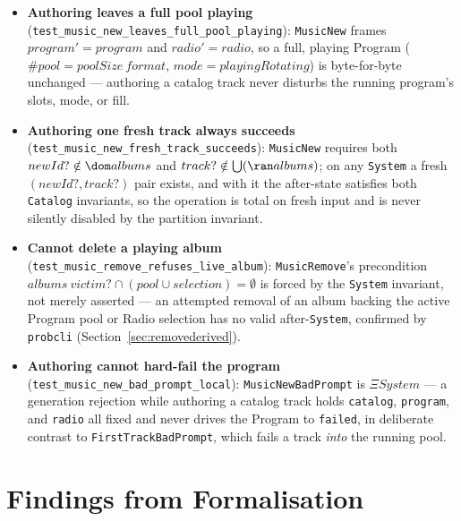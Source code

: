 \documentclass[a4paper,10pt,fleqn]{article}
\begin{document}
\begin{itemize}
    generate-internal outcome (\texttt{StaleFillIgnored}) and the auto
    vibe-switch (\texttt{RadioVibeIgnored}) stay \emph{enabled} against a Radio
    as total $\Xi Radio$ no-ops --- they are ignored, not disabled, and never
    errors. What is disabled is only the \emph{successful} fill branch: its
    $filling = ztrue$ guard has no inhabitant in a \texttt{Radio}, so that
    branch's precondition is false, leaving the enabled no-op as the sole
    inhabited operation.
  \item \textbf{Authoring leaves a full pool playing}
    (\texttt{test\_music\_new\_leaves\_full\_pool\_playing}): \texttt{MusicNew}
    frames $program' = program$ and $radio' = radio$, so a full, playing Program
    ($\# pool = poolSize~format$, $mode = playingRotating$) is byte-for-byte
    unchanged --- authoring a catalog track never disturbs the running
    program's slots, mode, or fill.
  \item \textbf{Authoring one fresh track always succeeds}
    (\texttt{test\_music\_new\_fresh\_track\_succeeds}): \texttt{MusicNew}
    requires both $newId? \notin \dom albums$ and
    $track? \notin \bigcup (\ran albums)$; on any \texttt{System} a fresh
    $(newId?, track?)$ pair exists, and with it the after-state satisfies both
    \texttt{Catalog} invariants, so the operation is total on fresh input and is
    never silently disabled by the partition invariant.
  \item \textbf{Cannot delete a playing album}
    (\texttt{test\_music\_remove\_refuses\_live\_album}): \texttt{MusicRemove}'s
    precondition $albums~victim? \cap (pool \cup selection) = \emptyset$ is
    forced by the \texttt{System} invariant, not merely asserted --- an attempted
    removal of an album backing the active Program pool or Radio selection has no
    valid after-\texttt{System}, confirmed by \texttt{probcli}
    (Section~\ref{sec:removederived}).
  \item \textbf{Authoring cannot hard-fail the program}
    (\texttt{test\_music\_new\_bad\_prompt\_local}): \texttt{MusicNewBadPrompt}
    is \texttt{$\Xi System$} --- a generation rejection while authoring a catalog
    track holds \texttt{catalog}, \texttt{program}, and \texttt{radio} all fixed
    and never drives the Program to \texttt{failed}, in deliberate contrast to
    \texttt{FirstTrackBadPrompt}, which fails a track \emph{into} the running
    pool.
\end{itemize}

\section{Findings from Formalisation}
\label{sec:findings}
\end{document}
